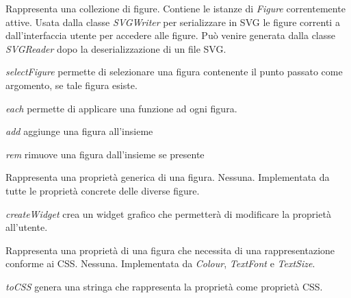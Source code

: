 Rappresenta una collezione di figure.
Contiene le istanze di \textit{Figure} correntemente attive.
Usata dalla classe \textit{SVGWriter} per serializzare in SVG le figure correnti a dall'interfaccia utente per accedere alle figure. Pu\`o venire generata dalla classe \textit{SVGReader} dopo la deserializzazione di un file SVG.
\begin{elencopuntato}[\textbf{}]{\subsubsecindent}
\item \textit{selectFigure} permette di selezionare una figura contenente il punto passato come argomento, se tale figura esiste.
\item \textit{each} permette di applicare una funzione ad ogni figura.
\item \textit{add} aggiunge una figura all'insieme
\item \textit{rem} rimuove una figura dall'insieme se presente
\end{elencopuntato}

Rappresenta una propriet\`a generica di una figura.
Nessuna.
Implementata da tutte le propriet\`a concrete delle diverse figure.
\begin{elencopuntato}[\textbf{}]{\subsubsecindent}
\item \textit{createWidget} crea un widget grafico che permetter\`a di modificare la propriet\`a all'utente.
\end{elencopuntato}

Rappresenta una propriet\`a di una figura che necessita di una rappresentazione conforme ai CSS.
Nessuna.
Implementata da \textit{Colour}, \textit{TextFont} e \textit{TextSize}. 
\begin{elencopuntato}[\textbf{}]{\subsubsecindent}
\item \textit{toCSS} genera una stringa che rappresenta la propriet\`a come propriet\`a CSS.
\end{elencopuntato}

